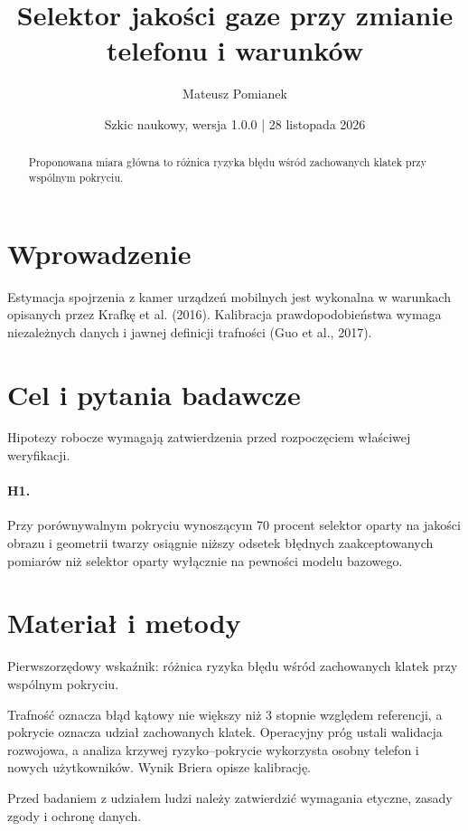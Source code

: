 \documentclass[11pt,a4paper]{article}
\title{Selektor jakości gaze przy zmianie telefonu i warunków}
\author{Mateusz Pomianek}
\date{Szkic naukowy, wersja 1.0.0 | 28 listopada 2026}
\begin{document}
\maketitle

\begin{abstract}

Proponowana miara główna to różnica ryzyka błędu wśród zachowanych klatek przy wspólnym pokryciu.

\end{abstract}

\section{Wprowadzenie}

Estymacja spojrzenia z kamer urządzeń mobilnych jest wykonalna w warunkach opisanych przez Krafkę et al. (2016). Kalibracja prawdopodobieństwa wymaga niezależnych danych i jawnej definicji trafności (Guo et al., 2017).

\section{Cel i pytania badawcze}

Hipotezy robocze wymagają zatwierdzenia przed rozpoczęciem właściwej weryfikacji.

\paragraph{H1.} Przy porównywalnym pokryciu wynoszącym 70 procent selektor oparty na jakości obrazu i geometrii twarzy osiągnie niższy odsetek błędnych zaakceptowanych pomiarów niż selektor oparty wyłącznie na pewności modelu bazowego.

\section{Materiał i metody}

Pierwszorzędowy wskaźnik: różnica ryzyka błędu wśród zachowanych klatek przy wspólnym pokryciu.

Trafność oznacza błąd kątowy nie większy niż 3 stopnie względem referencji, a pokrycie oznacza udział zachowanych klatek. Operacyjny próg ustali walidacja rozwojowa, a analiza krzywej ryzyko–pokrycie wykorzysta osobny telefon i nowych użytkowników. Wynik Briera opisze kalibrację.

Przed badaniem z udziałem ludzi należy zatwierdzić wymagania etyczne, zasady zgody i ochronę danych.
\end{document}
